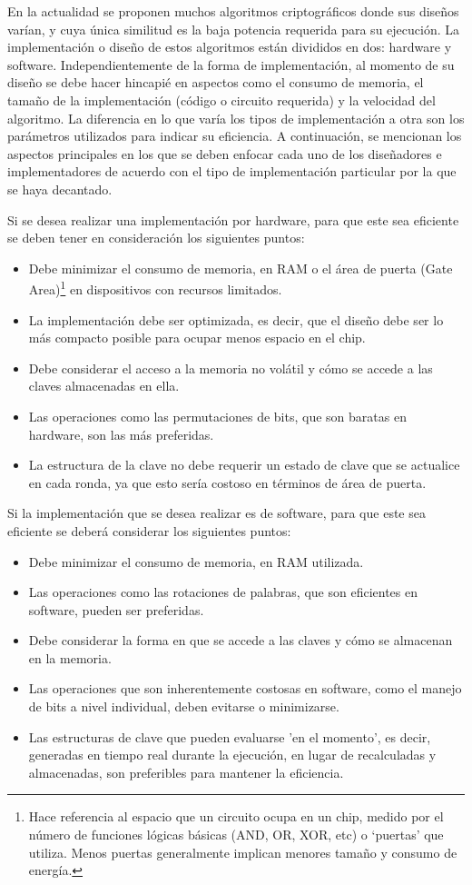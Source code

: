 \documentclass[a4paper,10pt]{article}
\begin{document}
	En la actualidad se proponen muchos algoritmos criptográficos donde sus diseños varían, y cuya única similitud es la baja potencia requerida para su ejecución. La implementación o diseño de estos algoritmos están divididos en dos: hardware y software. Independientemente de la forma de implementación, al momento de su diseño se debe hacer hincapié en aspectos como el consumo de memoria, el tamaño de la implementación (código o circuito requerida) y la velocidad del algoritmo. La diferencia en lo que varía los tipos de implementación a otra son los parámetros utilizados para indicar su eficiencia.
	A continuación, se mencionan los aspectos principales en los que se deben enfocar cada uno de los diseñadores e implementadores de acuerdo con el tipo de implementación particular por la que se haya decantado.
	
	Si se desea realizar una implementación por hardware, para que este sea eficiente se deben tener en consideración los siguientes puntos:
	\begin{itemize}
		\item Debe minimizar el consumo de memoria, en RAM o el área de puerta (Gate Area)\footnote{Hace referencia al espacio que un circuito ocupa en un chip, medido por el número de funciones lógicas básicas (AND, OR, XOR, etc) o ‘puertas’ que utiliza. Menos puertas generalmente implican menores tamaño y consumo de energía.} en dispositivos con recursos limitados.
		\item La implementación debe ser optimizada, es decir, que el diseño debe ser lo más compacto posible para ocupar menos espacio en el chip.
		\item Debe considerar el acceso a la memoria no volátil y cómo se accede a las claves almacenadas en ella.
		\item Las operaciones como las permutaciones de bits, que son baratas en hardware, son las más preferidas.
		\item La estructura de la clave no debe requerir un estado de clave que se actualice en cada ronda, ya que esto sería costoso en términos de área de puerta.
	\end{itemize}
	Si la implementación que se desea realizar es de software, para que este sea eficiente se deberá considerar los siguientes puntos:
	\begin{itemize}
		\item Debe minimizar el consumo de memoria, en RAM utilizada.
		\item Las operaciones como las rotaciones de palabras, que son eficientes en software, pueden ser preferidas.
		\item Debe considerar la forma en que se accede a las claves y cómo se almacenan en la memoria.
		\item Las operaciones que son inherentemente costosas en software, como el manejo de bits a nivel individual, deben evitarse o minimizarse.
		\item Las estructuras de clave que pueden evaluarse 'en el momento', es decir, generadas en tiempo real durante la ejecución, en lugar de recalculadas y almacenadas, son preferibles para mantener la eficiencia.
	\end{itemize}
\end{document}
